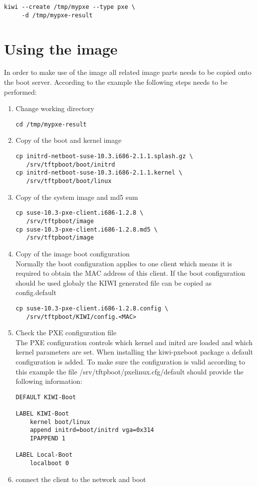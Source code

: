 \begin{Command}{12cm}
\begin{verbatim}
kiwi --create /tmp/mypxe --type pxe \
     -d /tmp/mypxe-result
\end{verbatim}
\end{Command}

\section{Using the image}

In order to make use of the image all related image parts needs 
to be copied onto the boot server. According to the example the following
steps needs to be performed:

\begin{enumerate}
\item Change working directory
\begin{verbatim}
cd /tmp/mypxe-result
\end{verbatim}
\item Copy of the boot and kernel image
\begin{verbatim}
cp initrd-netboot-suse-10.3.i686-2.1.1.splash.gz \
   /srv/tftpboot/boot/initrd
cp initrd-netboot-suse-10.3.i686-2.1.1.kernel \
   /srv/tftpboot/boot/linux
\end{verbatim}
\item Copy of the system image and md5 sum
\begin{verbatim}
cp suse-10.3-pxe-client.i686-1.2.8 \
   /srv/tftpboot/image
cp suse-10.3-pxe-client.i686-1.2.8.md5 \
   /srv/tftpboot/image
\end{verbatim}
\item Copy of the image boot configuration\\
      Normally the boot configuration applies to one client which
      means it is required to obtain the MAC address of this client.
      If the boot configuration should be used globaly the KIWI
      generated file can be copied as config.default
\begin{verbatim}
cp suse-10.3-pxe-client.i686-1.2.8.config \
   /srv/tftpboot/KIWI/config.<MAC>
\end{verbatim}
\item Check the PXE configuration file\\
      The PXE configuration controls which kernel and initrd are
      loaded and which kernel parameters are set. When installing
      the kiwi-pxeboot package a default configuration is added.
      To make sure the configuration is valid according to this
      example the file /srv/tftpboot/pxelinux.cfg/default should
      provide the following information:
\begin{verbatim}
DEFAULT KIWI-Boot

LABEL KIWI-Boot
    kernel boot/linux
    append initrd=boot/initrd vga=0x314
    IPAPPEND 1

LABEL Local-Boot
    localboot 0
\end{verbatim}
\item connect the client to the network and boot
\end{enumerate}

